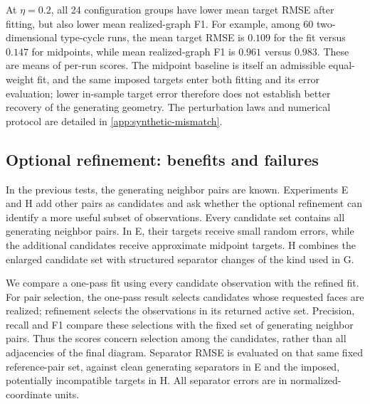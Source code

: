 At $\eta=0.2$, all 24 configuration groups have lower mean target RMSE after fitting, but also lower mean realized-graph F1. For example, among 60 two-dimensional type-cycle runs, the mean target RMSE is $0.109$ for the fit versus $0.147$ for midpoints, while mean realized-graph F1 is $0.961$ versus $0.983$. These are means of per-run scores. The midpoint baseline is itself an admissible equal-weight fit, and the same imposed targets enter both fitting and its error evaluation; lower in-sample target error therefore does not establish better recovery of the generating geometry. The perturbation laws and numerical protocol are detailed in \ref{app:synthetic-mismatch}.



\subsection{Optional refinement: benefits and failures}
\label{subsec:numerical-refinement}

In the previous tests, the generating neighbor pairs are known. Experiments E and H add other pairs as candidates and ask whether the optional refinement can identify a more useful subset of observations. Every candidate set contains all generating neighbor pairs. In E, their targets receive small random errors, while the additional candidates receive approximate midpoint targets. H combines the enlarged candidate set with structured separator changes of the kind used in G.

We compare a one-pass fit using every candidate observation with the refined fit. For pair selection, the one-pass result selects candidates whose requested faces are realized; refinement selects the observations in its returned active set. Precision, recall and F1 compare these selections with the fixed set of generating neighbor pairs. Thus the scores concern selection among the candidates, rather than all adjacencies of the final diagram. Separator RMSE is evaluated on that same fixed reference-pair set, against clean generating separators in E and the imposed, potentially incompatible targets in H. All separator errors are in normalized-coordinate units.

